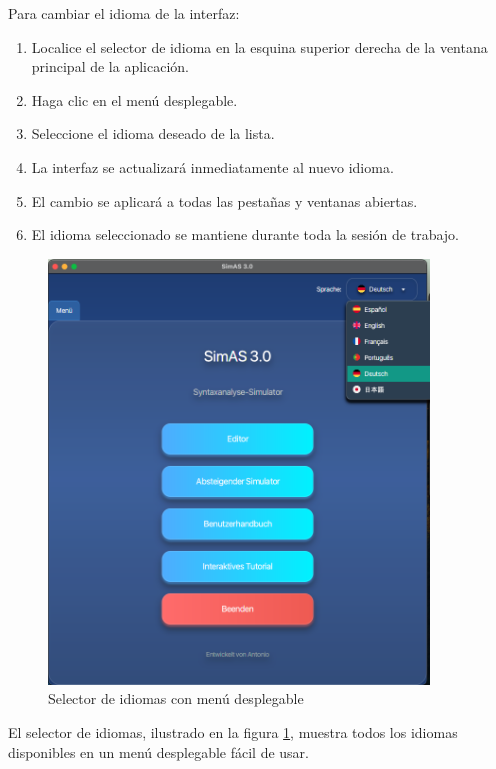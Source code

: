 Para cambiar el idioma de la interfaz:

\begin{enumerate}
    \item Localice el selector de idioma en la esquina superior derecha de la ventana principal de la aplicación.
    \item Haga clic en el menú desplegable.
    \item Seleccione el idioma deseado de la lista.
    \item La interfaz se actualizará inmediatamente al nuevo idioma.
    \item El cambio se aplicará a todas las pestañas y ventanas abiertas.
    \item El idioma seleccionado se mantiene durante toda la sesión de trabajo.
\end{enumerate}

\needspace{8cm}
\begin{figure}[H]
    \centering
    \includegraphics[width=0.9\textwidth]{figuras/menu_idiomas.png}
    \caption{Selector de idiomas con menú desplegable}
    \label{fig:menu_idiomas}
\end{figure}

El selector de idiomas, ilustrado en la figura \ref{fig:menu_idiomas}, muestra todos los idiomas disponibles en un menú desplegable fácil de usar.

